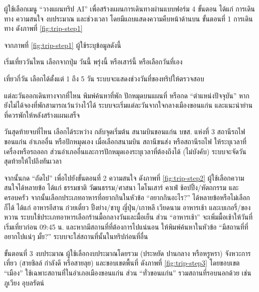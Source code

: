 ผู้ใช้เลือกเมนู ``วางแผนทริป AI'' เพื่อสร้างแผนการเดินทางผ่านแบบฟอร์ม 4 ขั้นตอน ได้แก่ การเดินทาง ความสนใจ งบประมาณ และช่วงเวลา โดยมีแถบแสดงความคืบหน้าด้านบน ขั้นตอนที่ 1 การเดินทาง ดังภาพที่ \ref{fig:trip-step1}


จากภาพที่ \ref{fig:trip-step1} ผู้ใช้ระบุข้อมูลดังนี้

\begin{numlist}
\item เริ่มเที่ยววันไหน เลือกจากปุ่ม วันนี้ พรุ่งนี้ หรือเสาร์นี้ หรือเลือกวันที่เอง
\item เที่ยวกี่วัน เลือกได้ตั้งแต่ 1 ถึง 5 วัน ระบบจะแสดงช่วงวันที่ของทริปให้ตรวจสอบ
\item แต่ละวันออกเดินทางจากที่ไหน พิมพ์ค้นหาที่พัก ปักหมุดบนแผนที่ หรือกด ``ตำแหน่งปัจจุบัน'' หากยังไม่ได้จองที่พักสามารถเว้นว่างไว้ได้ ระบบจะเริ่มแต่ละวันจากใจกลางเมืองขอนแก่น และแนะนำย่านที่ควรพักให้หลังสร้างแผนเสร็จ
\item วันสุดท้ายจบที่ไหน เลือกได้ระหว่าง กลับจุดเริ่มต้น สนามบินขอนแก่น บขส. แห่งที่ 3 สถานีรถไฟขอนแก่น อำเภออื่น หรือปักหมุดเอง เมื่อเลือกสนามบิน สถานีขนส่ง หรือสถานีรถไฟ ให้ระบุเวลาที่เครื่องหรือรถออก ส่วนอำเภออื่นและการปักหมุดเองระบุเวลาที่ต้องถึงได้ (ไม่บังคับ) ระบบจะจัดวันสุดท้ายให้ไปถึงทันเวลา
\end{numlist}

จากนั้นกด ``ถัดไป'' เพื่อไปยังขั้นตอนที่ 2 ความสนใจ ดังภาพที่ \ref{fig:trip-step2} ผู้ใช้เลือกความสนใจได้หลายข้อ ได้แก่ ธรรมชาติ วัฒนธรรม/ศาสนา ไดโนเสาร์ คาเฟ่ ช้อปปิ้ง/หัตถกรรม และครอบครัว จากนั้นเลือกประเภทอาหารที่อยากกินในหัวข้อ ``อยากกินอะไร?'' ได้หลายข้อหรือไม่เลือกก็ได้ ได้แก่ อาหารอีสาน ก๋วยเตี๋ยว ปิ้งย่าง/ชาบู ญี่ปุ่น/เกาหลี เวียดนาม อาหารเช้า และเบเกอรี่/ของหวาน ระบบใช้ประเภทอาหารเลือกร้านมื้อกลางวันและมื้อเย็น ส่วน ``อาหารเช้า'' จะเพิ่มมื้อเช้าให้วันที่เริ่มเที่ยวก่อน 09:45 น. และหากมีสถานที่ที่ต้องการไปแน่นอน ให้พิมพ์ค้นหาในหัวข้อ ``มีสถานที่ที่อยากไปแน่ๆ มั้ย?'' ระบบจะใส่สถานที่นั้นในทริปก่อนที่อื่น


ขั้นตอนที่ 3 งบประมาณ ผู้ใช้เลือกงบประมาณโดยรวม (ประหยัด ปานกลาง หรือหรูหรา) จังหวะการเที่ยว (สายชิลล์ กำลังดี หรือสายลุย) และขอบเขตพื้นที่ ดังภาพที่ \ref{fig:trip-step3} โดยขอบเขต ``เมือง'' ใช้เฉพาะสถานที่ในอำเภอเมืองขอนแก่น ส่วน ``ทั่วขอนแก่น'' รวมสถานที่รอบนอกด้วย เช่น ภูเวียง อุบลรัตน์


